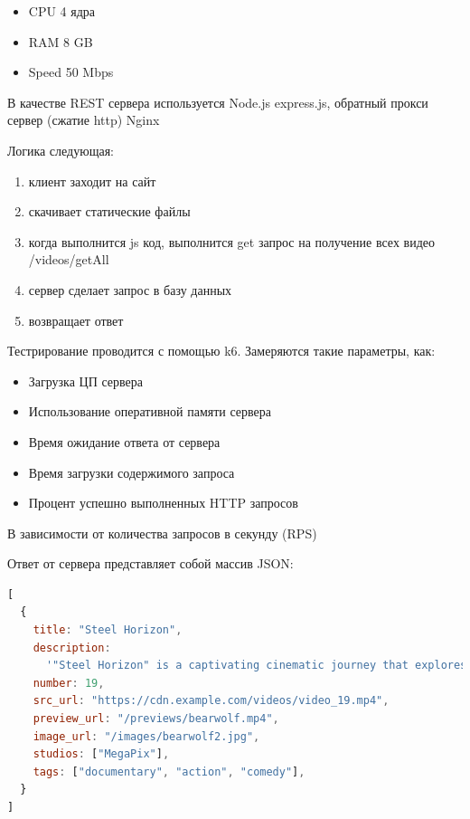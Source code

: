 \documentclass[12pt]{article}
\begin{document}
\begin{itemize}
    \item CPU 4 ядра
    \item RAM 8 GB
    \item Speed 50 Mbps
\end{itemize}

В качестве REST сервера используется Node.js express.js, обратный прокси сервер (сжатие http) Nginx

Логика следующая:

\begin{enumerate}
    \item клиент заходит на сайт
    \item скачивает статические файлы
    \item когда выполнится js код, выполнится get запрос на получение всех видео /videos/getAll
    \item сервер сделает запрос в базу данных
    \item возвращает ответ
\end{enumerate}

Тестрирование проводится с помощью k6. Замеряются такие параметры, как:

\begin{itemize}
    \item Загрузка ЦП сервера
    \item Использование оперативной памяти сервера
    \item Время ожидание ответа от сервера
    \item Время загрузки содержимого запроса
    \item Процент успешно выполненных HTTP запросов
\end{itemize}

В зависимости от количества запросов в секунду (RPS)

Ответ от сервера представляет собой массив JSON:

\begin{lstlisting}[language=JavaScript]
[
  {
    title: "Steel Horizon",
    description:
      '"Steel Horizon" is a captivating cinematic journey that explores the boundaries of imagination and reality. With stunning visuals and a compelling narrative, it draws viewers into a richly woven tale full of emotion, suspense, and intrigue. As the characters navigate through complex challenges, deep personal struggles, and unexpected twists, the story unfolds with intensity and grace. Crafted by visionary creators, the film blends elements of classic storytelling with modern cinematic techniques to create an unforgettable experience. Whether you\'re drawn to heartfelt drama, thrilling action, or thought-provoking ideas, this film offers a powerful reflection on humanity, resilience, and discovery.',
    number: 19,
    src_url: "https://cdn.example.com/videos/video_19.mp4",
    preview_url: "/previews/bearwolf.mp4",
    image_url: "/images/bearwolf2.jpg",
    studios: ["MegaPix"],
    tags: ["documentary", "action", "comedy"],
  }
]
\end{lstlisting}
\end{document}
